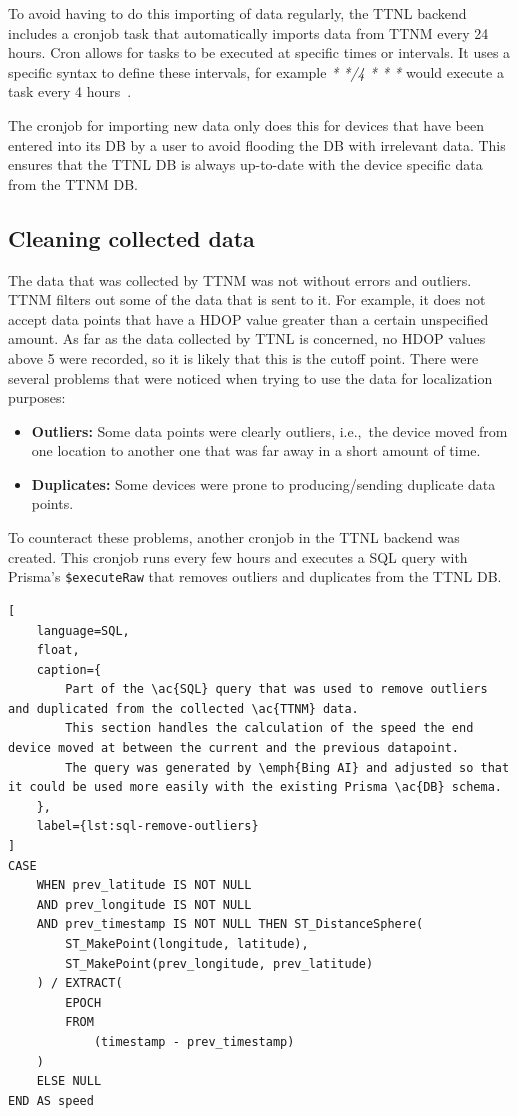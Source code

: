 To avoid having to do this importing of data regularly, the \ac{TTNL} backend includes a cronjob task that automatically imports data from \ac{TTNM} every 24 hours.
Cron allows for tasks to be executed at specific times or intervals.
It uses a specific syntax to define these intervals, for example \emph{* */4 * * *} would execute a task every 4 hours~\cite{drake_how_2020}.

The cronjob for importing new data only does this for devices that have been entered into its \ac{DB} by a user to avoid flooding the \ac{DB} with irrelevant data.
This ensures that the \ac{TTNL} \ac{DB} is always up-to-date with the device specific data from the \ac{TTNM} \ac{DB}.

\subsection{Cleaning collected data}\label{subsec:cleaning-collected-data}

The data that was collected by \ac{TTNM} was not without errors and outliers.
\ac{TTNM} filters out some of the data that is sent to it.
For example, it does not accept data points that have a \ac{HDOP} value greater than a certain unspecified amount.
As far as the data collected by \ac{TTNL} is concerned, no \ac{HDOP} values above 5 were recorded, so it is likely that this is the cutoff point.
There were several problems that were noticed when trying to use the data for localization purposes:

\begin{itemize}
    \item \textbf{Outliers:} Some data points were clearly outliers, i.e.,\ the device moved from one location to another one that was far away in a short amount of time.
    \item \textbf{Duplicates:} Some devices were prone to producing/sending duplicate data points.
\end{itemize}

To counteract these problems, another cronjob in the \ac{TTNL} backend was created.
This cronjob runs every few hours and executes a \ac{SQL} query with Prisma's \lstinline|$executeRaw| that removes outliers and duplicates from the \ac{TTNL} \ac{DB}.

\begin{lstlisting}[
    language=SQL,
    float,
    caption={
        Part of the \ac{SQL} query that was used to remove outliers and duplicated from the collected \ac{TTNM} data.
        This section handles the calculation of the speed the end device moved at between the current and the previous datapoint.
        The query was generated by \emph{Bing AI} and adjusted so that it could be used more easily with the existing Prisma \ac{DB} schema.
    },
    label={lst:sql-remove-outliers}
]
CASE
    WHEN prev_latitude IS NOT NULL
    AND prev_longitude IS NOT NULL
    AND prev_timestamp IS NOT NULL THEN ST_DistanceSphere(
        ST_MakePoint(longitude, latitude),
        ST_MakePoint(prev_longitude, prev_latitude)
    ) / EXTRACT(
        EPOCH
        FROM
            (timestamp - prev_timestamp)
    )
    ELSE NULL
END AS speed
\end{lstlisting}

